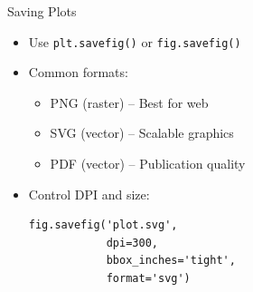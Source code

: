 \documentclass{beamer}
\begin{document}
\begin{frame}[fragile]{Saving Plots}
    \begin{itemize}
        \item Use \texttt{plt.savefig()} or \texttt{fig.savefig()}
        \item Common formats:
        \begin{itemize}
            \item PNG (raster) -- Best for web
            \item SVG (vector) -- Scalable graphics
            \item PDF (vector) -- Publication quality
        \end{itemize}
        \item Control DPI and size:
        \begin{lstlisting}
fig.savefig('plot.svg', 
            dpi=300,
            bbox_inches='tight',
            format='svg')
        \end{lstlisting}
    \end{itemize}
\end{frame}
\end{document}
